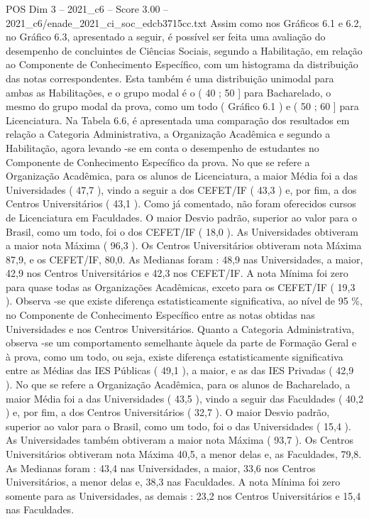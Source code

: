 \begin{textsample}{POS Dim 3 – 2021\_c6 – Score 3.00 – 2021\_c6/enade\_2021\_ci\_soc\_edcb3715cc.txt}
Assim como nos Gráficos 6.1 e 6.2, no Gráfico 6.3, apresentado a seguir, é possível ser feita uma avaliação do desempenho de concluintes de Ciências Sociais, segundo a Habilitação, em relação ao Componente de Conhecimento Específico, com um histograma da distribuição das notas correspondentes.
Esta também é uma distribuição unimodal para ambas as Habilitações, e o grupo modal é o ( 40 ; 50 ] para Bacharelado, o mesmo do grupo modal da prova, como um todo ( Gráfico 6.1 ) e ( 50 ; 60 ] para Licenciatura.
Na Tabela 6.6, é apresentada uma comparação dos resultados em relação a Categoria Administrativa, a Organização Acadêmica e segundo a Habilitação, agora levando -se em conta o desempenho de estudantes no Componente de Conhecimento Específico da prova.
No que se refere a Organização Acadêmica, para os alunos de Licenciatura, a maior Média foi a das Universidades ( 47,7 ), vindo a seguir a dos CEFET/IF ( 43,3 ) e, por fim, a dos Centros Universitários ( 43,1 ).
Como já comentado, não foram oferecidos cursos de Licenciatura em Faculdades.
O maior Desvio padrão, superior ao valor para o Brasil, como um todo, foi o dos CEFET/IF ( 18,0 ).
As Universidades obtiveram a maior nota Máxima ( 96,3 ).
Os Centros Universitários obtiveram nota Máxima 87,9, e os CEFET/IF, 80,0.
As Medianas foram : 48,9 nas Universidades, a maior, 42,9 nos Centros Universitários e 42,3 nos CEFET/IF.
A nota Mínima foi zero para quase todas as Organizações Acadêmicas, exceto para os CEFET/IF ( 19,3 ).
Observa -se que existe diferença estatisticamente significativa, ao nível de 95 \%, no Componente de Conhecimento Específico entre as notas obtidas nas Universidades e nos Centros Universitários.
Quanto a Categoria Administrativa, observa -se um comportamento semelhante àquele da parte de Formação Geral e à prova, como um todo, ou seja, existe diferença estatisticamente significativa entre as Médias das IES Públicas ( 49,1 ), a maior, e as das IES Privadas ( 42,9 ).
No que se refere a Organização Acadêmica, para os alunos de Bacharelado, a maior Média foi a das Universidades ( 43,5 ), vindo a seguir das Faculdades ( 40,2 ) e, por fim, a dos Centros Universitários ( 32,7 ).
O maior Desvio padrão, superior ao valor para o Brasil, como um todo, foi o das Universidades ( 15,4 ).
As Universidades também obtiveram a maior nota Máxima ( 93,7 ).
Os Centros Universitários obtiveram nota Máxima 40,5, a menor delas e, as Faculdades, 79,8.
As Medianas foram : 43,4 nas Universidades, a maior, 33,6 nos Centros Universitários, a menor delas e, 38,3 nas Faculdades.
A nota Mínima foi zero somente para as Universidades, as demais : 23,2 nos Centros Universitários e 15,4 nas Faculdades.

\end{textsample}

